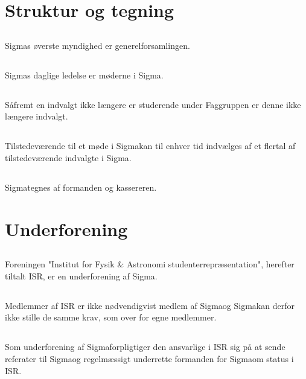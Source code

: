 \documentclass[danish,a4paper,twocolumn]{article}
\newcommand{\foreningen}{Sigma}
\begin{document}
\section{Struktur og tegning}
\subsection{}\foreningen s øverste myndighed er generelforsamlingen.
\subsection{}\foreningen s daglige ledelse er møderne i \foreningen.
\subsection{}Såfremt en indvalgt ikke længere er studerende under Faggruppen er denne ikke længere indvalgt.
\subsection{}Tilstedeværende til et møde i \foreningen kan til enhver tid indvælges af et flertal af tilstedeværende indvalgte i \foreningen.
\subsection{}\foreningen tegnes af formanden og kassereren.

\section{Underforening}
\subsection{}Foreningen "Institut for Fysik \& Astronomi studenterrepræsentation", herefter tiltalt ISR, er en underforening af \foreningen.
\subsection{}Medlemmer af ISR er ikke nødvendigvist medlem af \foreningen og \foreningen kan derfor ikke stille de samme krav, som over for egne medlemmer.
\subsection{}Som underforening af \foreningen forpligtiger den ansvarlige i ISR sig på at sende referater til \foreningen og regelmæssigt underrette formanden for \foreningen om status i ISR.
\end{document}
